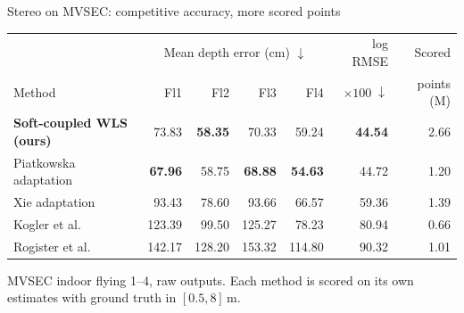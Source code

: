 \begin{frame}{Stereo on MVSEC: competitive accuracy, more scored points}
\footnotesize
\abovedisplayskip=2pt\belowdisplayskip=2pt
\vfill
\begin{center}\small\begin{tabular}{lrrrrrr}
\toprule & \multicolumn{4}{c}{Mean depth error (cm) $\downarrow$}&log RMSE&Scored\\
Method & Fl1&Fl2&Fl3&Fl4&$\times100\;\downarrow$&points (M)\\\midrule
\textbf{Soft-coupled WLS (ours)}&73.83&\textbf{58.35}&70.33&59.24&\textbf{44.54}&2.66\\\midrule
Piatkowska adaptation~\cite{piatkowska2017}&\textbf{67.96}&58.75&\textbf{68.88}&\textbf{54.63}&44.72&1.20\\
Xie adaptation~\cite{Xie2018}&93.43&78.60&93.66&66.57&59.36&1.39\\
Kogler et al.~\cite{kogler2011}&123.39&99.50&125.27&78.23&80.94&0.66\\
Rogister et al.~\cite{Rogister2012}&142.17&128.20&153.32&114.80&90.32&1.01\\\bottomrule
\end{tabular}\end{center}\vspace*{-1mm}
{\scriptsize MVSEC indoor flying 1--4, raw outputs. Each method is scored on its own estimates with ground truth in $[0.5,8]$\,m.\par}
\vfill

\end{frame}
